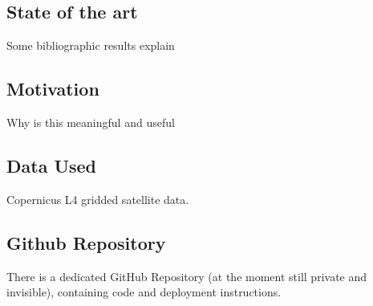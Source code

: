 \subsection{State of the art}
Some bibliographic results explain
\subsection{Motivation}
Why is this meaningful and useful
\subsection{Data Used}
Copernicus L4 gridded satellite data. 
\subsection{Github Repository}
There is a dedicated GitHub Repository (at the moment still private and invisible), containing code and deployment instructions. 